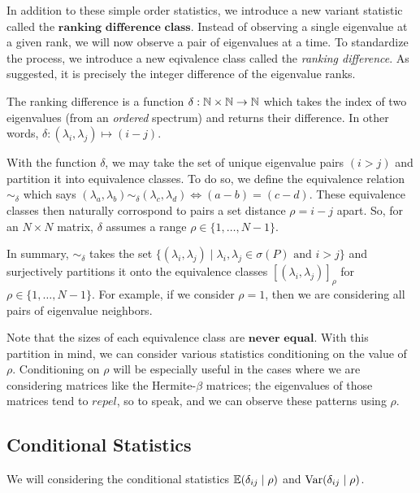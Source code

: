 In addition to these simple order statistics, we introduce a new variant statistic called the $\textbf{ranking difference class}$. Instead of observing a single eigenvalue at a given rank, we will now observe a pair of eigenvalues at a time. To standardize the process, we introduce a new eqivalence class called the \textit{ranking difference}. As suggested, it is precisely the integer difference of the eigenvalue ranks.

\begin{definition}
The ranking difference is a function $\delta: \mathbb{N} \times \mathbb{N} \to \mathbb{N}$ which takes the index of two eigenvalues (from an \textit{ordered} spectrum) and returns their difference. In other words, $\delta : (\lambda_i,\lambda_j) \mapsto (i - j)$.
\end{definition}

With the function $\delta$, we may take the set of unique eigenvalue pairs $(i > j)$ and partition it into equivalence classes. To do so, we define the equivalence relation $\sim_\delta$ which says $(\lambda_a,\lambda_b) \sim_\delta (\lambda_c,\lambda_d) \iff (a -b) = (c-d)$. These equivalence classes then naturally corrospond to pairs a set distance $\rho = i - j$ apart. So, for an $N \times N$ matrix, $\delta$ assumes a range $\rho \in \{ 1,\dots,N-1\}$.

In summary, $\sim_\delta$ takes the set $\{(\lambda_i, \lambda_j) \mid \lambda_i, \lambda_j \in \sigma(P) \text{ and } i > j \}$ and surjectively partitions it onto the equivalence classes $[(\lambda_i, \lambda_j)]_\rho$ for $\rho \in \{ 1,\dots,N-1\}$. For example, if we consider $\rho = 1$, then we are considering all pairs of eigenvalue neighbors.

Note that the sizes of each equivalence class are $\textbf{never equal}$. With this partition in mind, we can consider various statistics conditioning on the value of $\rho$. Conditioning on $\rho$ will be especially useful in the cases where we are considering matrices like the Hermite-$\beta$ matrices; the eigenvalues of those matrices tend to $\textit{repel}$, so to speak, and we can observe these patterns using $\rho$.

\subsection{Conditional Statistics}

We will considering the conditional statistics $\mathbb{E}(\delta_{ij} \mid \rho)$ and $\text{Var}(\delta_{ij} \mid \rho)$.

